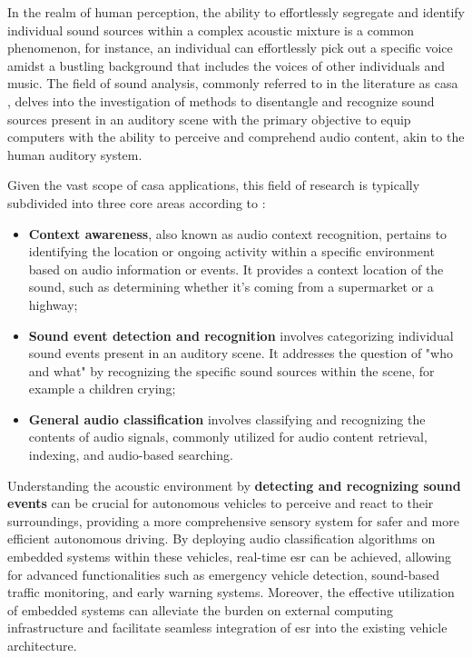 In the realm of human perception, the ability to effortlessly segregate and identify individual sound sources within a complex acoustic mixture is a common phenomenon, for instance, an individual can effortlessly pick out a specific voice amidst a bustling background that includes the voices of other individuals and music. The field of sound analysis, commonly referred to in the literature as \gls{casa} \cite{Hermes2023}, delves into the investigation of methods to disentangle and recognize sound sources present in an auditory scene with the primary objective to equip computers with the ability to perceive and comprehend audio content, akin to the human auditory system. 

Given the vast scope of \gls{casa} applications, this field of research is typically subdivided into three core areas according to \textcite{Wang2006}:

\begin{itemize}
    \item \textbf{Context awareness}, also known as audio context recognition, pertains to identifying the location or ongoing activity within a specific environment based on audio information or events. It provides a context location of the sound, such as determining whether it's coming from a supermarket or a highway;
    \item \textbf{Sound event detection and recognition} involves categorizing individual sound events present in an auditory scene. It addresses the question of "who and what" by recognizing the specific sound sources within the scene, for example a children crying;
    \item \textbf{General audio classification} involves classifying and recognizing the contents of audio signals, commonly utilized for audio content retrieval, indexing, and audio-based searching.  
\end{itemize}

Understanding the acoustic environment by \textbf{detecting and recognizing sound events} can be crucial for autonomous vehicles to perceive and react to their surroundings, providing a more comprehensive sensory system for safer and more efficient autonomous driving. By deploying audio classification algorithms on embedded systems within these vehicles, real-time \gls{esr} can be achieved, allowing for advanced functionalities such as emergency vehicle detection, sound-based traffic monitoring, and early warning systems. Moreover, the effective utilization of embedded systems can alleviate the burden on external computing infrastructure and facilitate seamless integration of \gls{esr} into the existing vehicle architecture.


